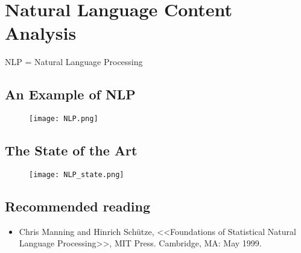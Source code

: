\section{Natural Language Content Analysis} 
NLP = Natural Language Processing

\subsection{An Example of NLP}
\begin{figure}[H]
    \centering
    \texttt{[image: NLP.png]}
\end{figure}

\subsection{The State of the Art}
\begin{figure}[H]
    \centering
    \texttt{[image: NLP\_state.png]}
\end{figure}

\subsection{Recommended reading}
\begin{itemize}
\item Chris Manning and Hinrich Sch{\"u}tze, <<Foundations of Statistical Natural Language Processing>>, MIT Press. Cambridge, MA: May 1999.
\end{itemize}
